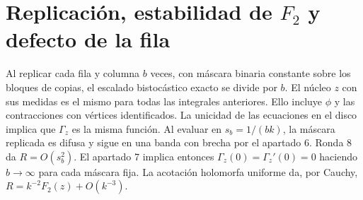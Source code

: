 \section{Replicación, estabilidad de $F_2$ y defecto de la fila}
Al replicar cada fila y columna $b$ veces, con máscara binaria constante sobre los
bloques de copias, el escalado bistocástico exacto se divide por $b$. El núcleo $z$
con sus medidas es el mismo para todas las integrales anteriores. Ello incluye
$\phi$ y las contracciones con vértices identificados. La unicidad de las ecuaciones
en el disco implica que $\Gamma_z$ es la misma función. Al evaluar en $s_b=1/(bk)$,
la máscara replicada es difusa y sigue en una banda con brecha por el apartado 6.
Ronda 8 da $R=O(s_b^2)$. El apartado 7 implica entonces
$\Gamma_z(0)=\Gamma_z'(0)=0$ haciendo $b\to\infty$ para cada máscara fija.
La acotación holomorfa uniforme da, por Cauchy, $R=k^{-2}F_2(z)+O(k^{-3})$.
